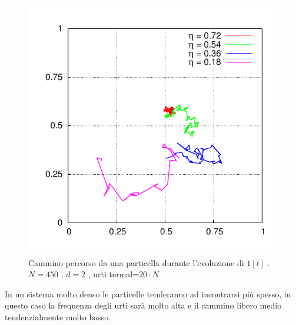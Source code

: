 \documentclass[11pt]{article}
\theoremstyle{plain}
\theoremstyle{remark}
\begin{document}
  \begin{figure}[h!]\vspace{-10pt}
     \begin{minipage}{0.4\textwidth}
		\begin{flushright}
		\includegraphics[scale=0.65]{Immagini/Rigide/Lc_2D}
		\end{flushright}
     \end{minipage}\hfill
     \begin{minipage}{0.55\textwidth}
     	\begin{flushleft}
		\caption[Sfere Rigide$/$Preliminari\_Cammino.cpp]{Cammino percorso da una particella durante l'evoluzione di $1 [t]$ .\newline \footnotesize{$N= 450$ , $d=2$ ,  urti termal=$ 20 \cdot N$}}\label{fig: SnapLiberoCammino}
     \end{flushleft}
     \end{minipage}\vspace{-15pt}
  \end{figure}

In un sistema molto denso le particelle tenderanno ad incontrarsi più spesso, in questo caso la frequenza degli urti sarà molto alta e il cammino libero medio tendenzialmente molto basso.
\end{document}
